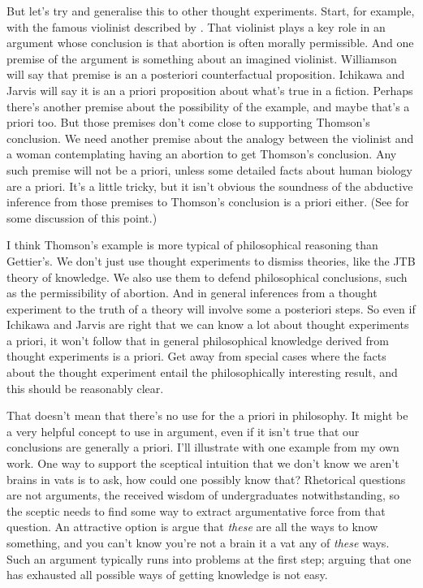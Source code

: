 But let's try and generalise this to other thought experiments. Start, for example, with the famous violinist described by  \citet{Thomson1971}. That violinist plays a key role in an argument whose conclusion is that abortion is often morally permissible. And one premise of the argument is something about an imagined violinist. Williamson will say that premise is an a posteriori counterfactual proposition. Ichikawa and Jarvis will say it is an a priori proposition about what's true in a fiction. Perhaps there's another premise about the possibility of the example, and maybe that's a priori too. But those premises don't come close to supporting Thomson's conclusion. We need another premise about the analogy between the violinist and a woman contemplating having an abortion to get Thomson's conclusion. Any such premise will not be a priori, unless some detailed facts about human biology are a priori. It's a little tricky, but it isn't obvious the soundness of the abductive inference from those premises to Thomson's conclusion is a priori either. (See  \citet{PargetterBigelow1997} for some discussion of this point.)

I think Thomson's example is more typical of philosophical reasoning than Gettier's. We don't just use thought experiments to dismiss theories, like the JTB theory of knowledge. We also use them to defend philosophical conclusions, such as the permissibility of abortion. And in general inferences from a thought experiment to the truth of a theory will involve some a posteriori steps. So even if Ichikawa and Jarvis are right that we can know a lot about thought experiments a priori, it won't follow that in general philosophical knowledge derived from thought experiments is a priori. Get away from special cases where the facts about the thought experiment entail the philosophically interesting result, and this should be reasonably clear.

That doesn't mean that there's no use for the a priori in philosophy. It might be a very helpful concept to use in argument, even if it isn't true that our conclusions are generally a priori. I'll illustrate with one example from my own work. One way to support the sceptical intuition that we don't know we aren't brains in vats is to ask, how could one possibly know that? Rhetorical questions are not arguments, the received wisdom of undergraduates notwithstanding, so the sceptic needs to find some way to extract argumentative force from that question. An attractive option is argue that \emph{these} are all the ways to know something, and you can't know you're not a brain it a vat any of \emph{these} ways. Such an argument typically runs into problems at the first step; arguing that one has exhausted all possible ways of getting knowledge is not easy.

